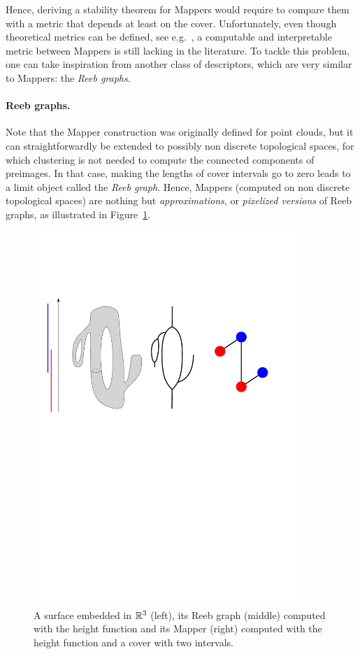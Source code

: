 Hence, deriving a stability theorem for Mappers would require to compare them with a metric that depends at least on the cover. 
Unfortunately, even though theoretical metrics can be defined, see e.g.~\cite{Munch16}, a computable and interpretable metric between Mappers is still lacking in the literature. 
To tackle this problem, one can take inspiration from another class of descriptors, which are very similar to Mappers: the {\em Reeb graphs}.

\paragraph*{Reeb graphs.} Note that the Mapper construction was originally defined for point clouds, but it can straightforwardly be extended to possibly
non discrete topological spaces, for which clustering is not needed to compute the connected components of preimages.
In that case, making the lengths of cover intervals go to zero leads to a limit object called the {\em Reeb graph}.
Hence, Mappers (computed on non discrete topological spaces) are nothing but {\em approximations}, or 
{\em pixelized versions} of Reeb graphs, as illustrated in Figure~\ref{fig:pixelization}.

\begin{figure}[h]\centering
\includegraphics[width=10cm]{figures/ExamplePixelization}
\caption[Mapper as a pixelization of the Reeb graph]{\label{fig:pixelization} A surface embedded in $\mathbb{R}^3$ (left), its Reeb graph (middle) computed with the height function and 
its Mapper (right) computed with the height function and a cover with two intervals.}
\end{figure}
  
